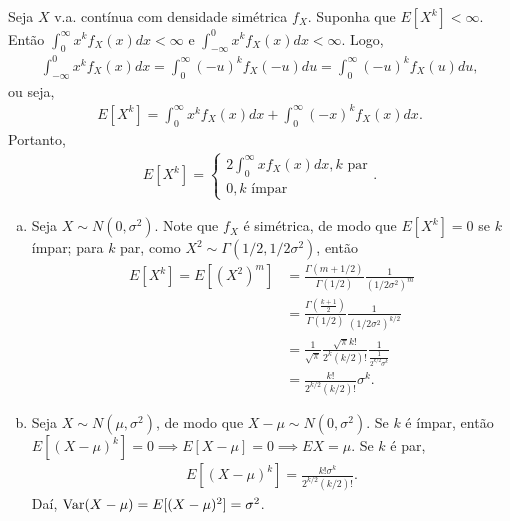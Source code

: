 \documentclass[../Notas.tex]{subfiles}
\begin{document}
\begin{example}
Seja $X$ v.a. contínua com densidade simétrica $f_X$. Suponha que $E[X^k] < \infty$. Então $\displaystyle{ \int_{0}^{\infty} x^k f_X(x) dx < \infty}$ e $\displaystyle{ \int_{-\infty}^{0} x^k f_X(x) dx < \infty}$. Logo,
\begin{align*}
    \int_{-\infty}^{0} x^k f_X(x) dx = \int_{0}^{\infty} (-u)^k f_X(-u) du = \int_{0}^{\infty} (-u)^k f_X(u) du,
\end{align*}
ou seja,
\begin{align*}
    E[X^k] = \int_{0}^{\infty} x^k f_X(x) dx + \int_{0}^{\infty} (-x)^k f_X(x) dx .
\end{align*}
Portanto,
\begin{align*}
    E[X^k] = \begin{cases}
    2\int_{0}^{\infty} xf_X(x) dx, k \text{ par} \\
    0, k \text{ ímpar}
    \end{cases}.
\end{align*}
\end{example}

\begin{example}
\begin{enumerate}[a)]
    \item Seja $X\sim N(0, \sigma^2)$. Note que $f_X$ é simétrica, de modo que $E[X^k] = 0$ se $k$ ímpar; para $k$ par, como $X^2\sim\Gamma(1/2, 1/2\sigma^2)$, então
\begin{align*}
    E[X^k] = E[(X^2)^m] &= \frac{ \Gamma(m+1/2) }{\Gamma(1/2)}\frac{1}{(1/2\sigma^2)^m} \\
    &= \frac{ \Gamma\left(\frac{k+1}{2}\right) }{ \Gamma(1/2) }\frac{1}{(1/2\sigma^2)^{k/2}} \\
    &= \frac{1}{\sqrt{\pi}}\frac{\sqrt{\pi} k!}{2^k (k/2)!}\frac{1}{\frac{1}{2^{k/2}\sigma^k}} \\
    &= \frac{k!}{2^{k/2}(k/2)!}\sigma^k.
\end{align*}
    \item Seja $X\sim N(\mu, \sigma^2)$, de modo que $X-\mu\sim N(0, \sigma^2)$. Se $k$ é ímpar, então $E[(X-\mu)^k] = 0 \implies E[X-\mu] = 0 \implies EX = \mu$. Se $k$ é par, 
    \begin{align*}
        E[(X-\mu)^k] = \frac{k!\sigma^k}{2^{k/2}(k/2)!}.
    \end{align*}
    Daí, $\text{Var}(X-\mu) = E[(X-\mu)^2] = \sigma^2$.
\end{enumerate}
\end{example}
\end{document}
